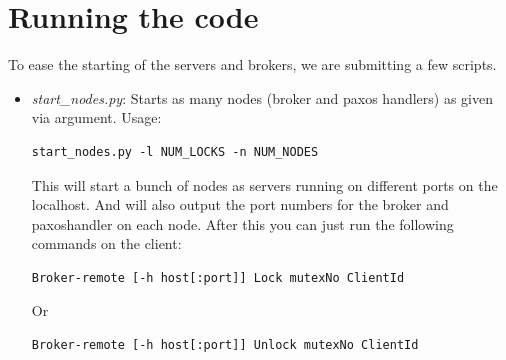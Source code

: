 \documentclass[letterpaper]{article}
\begin{document}
\section{Running the code}
To ease the starting of the servers and brokers, we are submitting a few scripts.
\begin{itemize}
\item {\em start\_nodes.py}: Starts as many nodes (broker and paxos handlers) as given via argument. Usage:
\begin{verbatim}
start_nodes.py -l NUM_LOCKS -n NUM_NODES
\end{verbatim}
This will start a bunch of nodes as servers running on different ports on the
localhost. And will also output the port numbers for the broker and paxoshandler
on each node. After this you can just run the following commands on the client:
\begin{verbatim}
Broker-remote [-h host[:port]] Lock mutexNo ClientId
\end{verbatim}
Or
\begin{verbatim}
Broker-remote [-h host[:port]] Unlock mutexNo ClientId
\end{verbatim}
\end{itemize}
\end{document}
